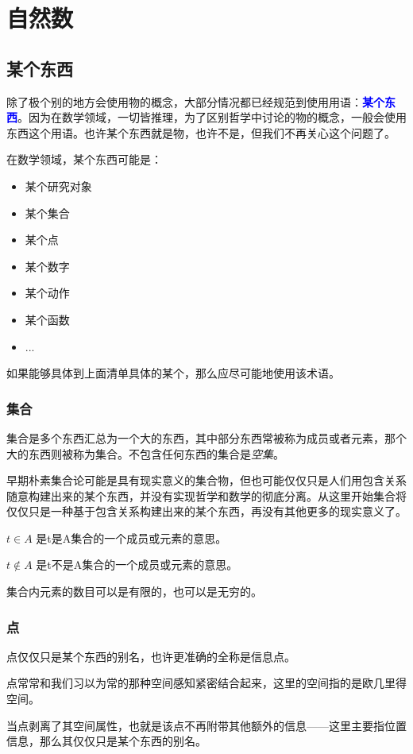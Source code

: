 \documentclass[12pt,oneside]{book}
\renewcommand{\emph}[1]{\textcolor{blue}{\textbf{#1}}}
\begin{document}
\chapter{自然数}
\section{某个东西}
除了极个别的地方会使用物的概念，大部分情况都已经规范到使用用语：\emph{某个东西}。因为在数学领域，一切皆推理，为了区别哲学中讨论的物的概念，一般会使用东西这个用语。也许某个东西就是物，也许不是，但我们不再关心这个问题了。

在数学领域，某个东西可能是：

\begin{itemize}
\item 某个研究对象
\item 某个集合
\item 某个点
\item 某个数字
\item 某个动作
\item 某个函数
\item ...
\end{itemize}

如果能够具体到上面清单具体的某个，那么应尽可能地使用该术语。

\subsection{集合}
集合是多个东西汇总为一个大的东西，其中部分东西常被称为成员或者元素，那个大的东西则被称为集合。不包含任何东西的集合是\textit{空集}。

早期朴素集合论可能是具有现实意义的集合物，但也可能仅仅只是人们用包含关系随意构建出来的某个东西，并没有实现哲学和数学的彻底分离。从这里开始集合将仅仅只是一种基于包含关系构建出来的某个东西，再没有其他更多的现实意义了。

$t \in A$ 是t是A集合的一个成员或元素的意思。

$t \notin A$ 是t不是A集合的一个成员或元素的意思。

集合内元素的数目可以是有限的，也可以是无穷的。


\subsection{点}
点仅仅只是某个东西的别名，也许更准确的全称是信息点。

点常常和我们习以为常的那种空间感知紧密结合起来，这里的空间指的是欧几里得空间。

当点剥离了其空间属性，也就是该点不再附带其他额外的信息——这里主要指位置信息，那么其仅仅只是某个东西的别名。
\end{document}
